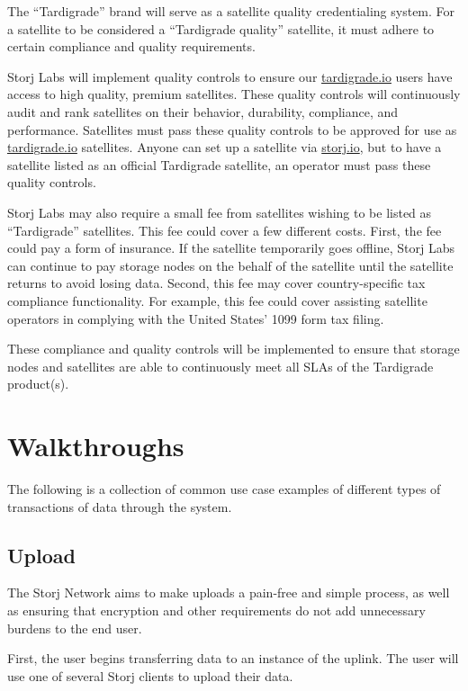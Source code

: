 \documentclass[11pt,fleqn,openany]{book}
\begin{document}
The ``Tardigrade'' brand will serve as a satellite quality credentialing system.
For a satellite to be considered a ``Tardigrade quality'' satellite, it must
adhere to certain compliance and quality requirements.

Storj Labs will implement quality controls to ensure our
\url{tardigrade.io} users have access to high quality, premium satellites.
These quality controls will continuously audit and rank satellites on their
behavior, durability, compliance, and performance.
Satellites must pass these quality controls to be approved for use as
\url{tardigrade.io} satellites. Anyone can set up a satellite via
\url{storj.io}, but to have a satellite listed as an official Tardigrade
satellite, an operator must pass these quality controls.

Storj Labs may also require a small fee from satellites wishing to be listed
as ``Tardigrade'' satellites. This fee could cover a few different costs. First,
the fee could pay a form of insurance. If the satellite temporarily goes
offline, Storj Labs can continue to pay storage nodes on the behalf of the
satellite until the satellite returns to avoid losing data. Second, this fee
may cover country-specific tax compliance functionality. For example, this fee
could cover assisting satellite operators in complying with the United States'
1099 form tax filing.

These compliance and quality controls will be implemented to ensure that
storage nodes and satellites are able to continuously meet all SLAs of the
Tardigrade product(s).

\chapter{Walkthroughs}\label{chap:walkthroughs}

The following is a collection of common use case examples of different types of
transactions of data through the system.

\section{Upload}

The Storj Network aims to make uploads a pain-free and simple process, as well
as ensuring that encryption and other requirements do not add unnecessary
burdens to the end user.

First, the user begins transferring data to an instance of the uplink. The
user will use one of several Storj clients to upload their data.
\end{document}
